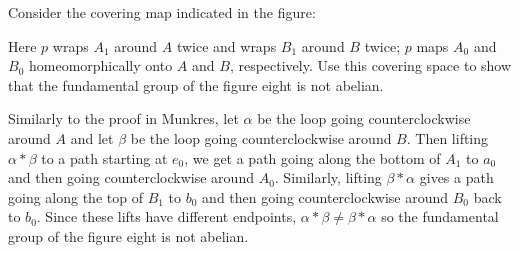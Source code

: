 \documentclass[11pt,letterpaper]{article}
\begin{document}
\begin{problem}%
    Consider the covering map indicated in the figure:
    \medskip
    \begin{center}
    \end{center}
    \medskip
    Here $p$ wraps $A_1$ around $A$ twice and wraps $B_1$ around $B$ twice; $p$ maps $A_0$ and $B_0$ homeomorphically onto $A$ and $B$, respectively. Use this covering space to show that the fundamental group of the figure eight is not abelian.
\end{problem}

\begin{solution}
    Similarly to the proof in Munkres, let $\alpha$ be the loop going counterclockwise around $A$ and let $\beta$ be the loop going counterclockwise around $B$. Then lifting $\alpha*\beta$ to a path starting at $e_0$, we get a path going along the bottom of $A_1$ to $a_0$ and then going counterclockwise around $A_0$. Similarly, lifting $\beta*\alpha$ gives a path going along the top of $B_1$ to $b_0$ and then going counterclockwise around $B_0$ back to $b_0$. Since these lifts have different endpoints, $\alpha*\beta\neq \beta*\alpha$ so the fundamental group of the figure eight is not abelian. 
\end{solution}
\end{document}
